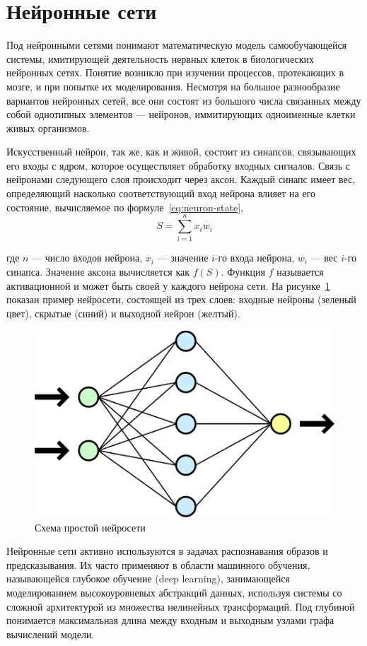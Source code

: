 \documentclass[a4paper,14pt]{extarticle} %
\begin{document}
\newpage

\section{Нейронные сети}
\hspace{\parindent} Под нейронными сетями понимают математическую модель самообучающейся системы, имитирующей деятельность нервных клеток в биологических нейронных сетях. Понятие возникло при изучении процессов, протекающих в мозге, и при попытке их моделирования. Несмотря на большое разнообразие вариантов нейронных сетей, все они состоят из большого числа связанных между собой однотипных элементов --- нейронов, иммитирующих одноименные клетки живых организмов.

Искусственный нейрон, так же, как и живой, состоит из синапсов, связывающих его входы с ядром, которое осуществляет обработку входных сигналов. Связь с нейронами следующего слоя происходит через аксон. Каждый синапс имеет вес, определяющий насколько соответствующий вход нейрона влияет на его состояние, вычисляемое по формуле~\ref{eq:neuron-state}, 
\begin{equation}
S = \sum_{i=1}^{n}x_iw_i
\label{eq:neuron-state}
\end{equation} 

\noindent где $n$ --- число входов нейрона, $x_i$ --- значение $i$-го входа нейрона, $w_i$ --- вес $i$-го синапса. Значение аксона вычисляется как $f(S)$. Функция $f$ называется активационной и может быть своей у каждого нейрона сети. На рисунке~\ref{fig:Neuralnetwork} показан пример нейросети, состоящей из трех слоев: входные нейроны (зеленый цвет), скрытые (синий) и выходной нейрон (желтый).
\begin{figure}[H]
\centering
\includegraphics[width=0.7\linewidth]{Neuralnetwork}
\caption{Схема простой нейросети}
\label{fig:Neuralnetwork}
\end{figure}

Нейронные сети активно используются в задачах распознавания образов и предсказывания. Их часто применяют в области машинного обучения, называющейся глубокое обучение (deep learning), занимающейся моделированием высокоуровневых абстракций данных, используя системы со сложной архитектурой из множества нелинейных трансформаций. Под глубиной понимается максимальная длина между входным и выходным узлами графа вычислений модели.
\end{document}
